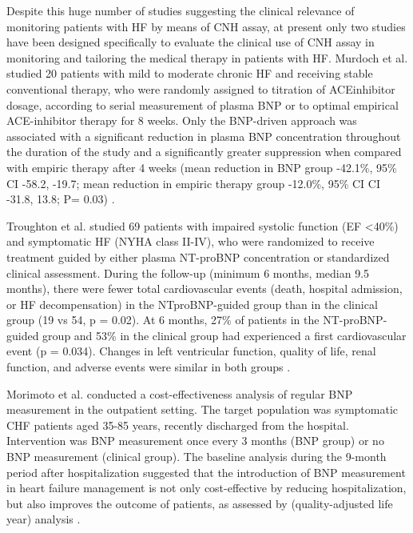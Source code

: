 \documentclass[14pt,a4paper,onecolumn]{extarticle}
\begin{document}
Despite this huge number of studies suggesting the clinical relevance of monitoring patients with HF by means of CNH assay, at present only two studies \citep{bib3252} \citep{bib3253} have
been designed specifically to evaluate the clinical use of CNH assay in monitoring and
tailoring the medical therapy in patients with HF.
Murdoch et al. \citep{bib3252} studied 20 patients with mild to moderate chronic HF and
receiving stable conventional therapy, who were randomly assigned to titration of ACEinhibitor dosage, according to serial measurement of plasma BNP or to optimal empirical ACE-inhibitor therapy for 8 weeks. Only the BNP-driven approach was associated
with a significant reduction in plasma BNP concentration throughout the duration of
the study and a significantly greater suppression when compared with empiric therapy after 4 weeks (mean reduction in BNP group -42.1\%, 95\% CI -58.2, -19.7; mean reduction in empiric therapy group -12.0\%, 95\% CI CI -31.8, 13.8; P= 0.03) \citep{bib3252}.

Troughton et al. \citep{bib3253} studied 69 patients with impaired systolic function (EF <40\%)
and symptomatic HF (NYHA class II-IV), who were randomized to receive treatment
guided by either plasma NT-proBNP concentration or standardized clinical assessment.
During the follow-up (minimum 6 months, median 9.5 months), there were fewer total
cardiovascular events (death, hospital admission, or HF decompensation) in the NTproBNP-guided group than in the clinical group (19 vs 54, p = 0.02). At 6 months, 27\%
of patients in the NT-proBNP-guided group and 53\% in the clinical group had experienced a first cardiovascular event (p = 0.034). Changes in left ventricular function, quality of life, renal function, and adverse events were similar in both groups \citep{bib3253}.

Morimoto et al. \citep{bib3263} conducted a cost-effectiveness analysis of regular BNP measurement in the outpatient setting. The target population was symptomatic CHF patients
aged 35-85 years, recently discharged from the hospital. Intervention was BNP measurement once every 3 months (BNP group) or no BNP measurement (clinical group).
The baseline analysis during the 9-month period after hospitalization suggested that the
introduction of BNP measurement in heart failure management is not only cost-effective by reducing hospitalization, but also improves the outcome of patients, as assessed
by (quality-adjusted life year) analysis \citep{bib3263}.
\end{document}

